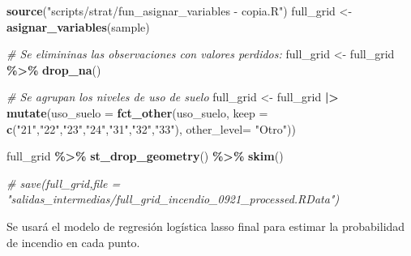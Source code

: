 \documentclass[12pt,a4paper,]{book}
\newenvironment{Shaded}{\begin{snugshade}}{\end{snugshade}}
\newcommand{\AttributeTok}[1]{\textcolor[rgb]{0.13,0.29,0.53}{#1}}
\newcommand{\CommentTok}[1]{\textcolor[rgb]{0.56,0.35,0.01}{\textit{#1}}}
\newcommand{\FunctionTok}[1]{\textcolor[rgb]{0.13,0.29,0.53}{\textbf{#1}}}
\newcommand{\NormalTok}[1]{#1}
\newcommand{\OtherTok}[1]{\textcolor[rgb]{0.56,0.35,0.01}{#1}}
\newcommand{\SpecialCharTok}[1]{\textcolor[rgb]{0.81,0.36,0.00}{\textbf{#1}}}
\newcommand{\StringTok}[1]{\textcolor[rgb]{0.31,0.60,0.02}{#1}}
\numberwithin{dummy}{section}
\theoremstyle{ocrenumbox}
\theoremstyle{blacknumex}
\theoremstyle{blacknumbox}
\theoremstyle{ocrenum}
\theoremstyle{ocrenum}
\begin{document}
\begin{Shaded}
\begin{Highlighting}[]
\FunctionTok{source}\NormalTok{(}\StringTok{"scripts/strat/fun\_asignar\_variables {-} copia.R"}\NormalTok{)}
\NormalTok{full\_grid }\OtherTok{\textless{}{-}} \FunctionTok{asignar\_variables}\NormalTok{(sample)}

\CommentTok{\# Se elimininas las observaciones con valores perdidos:}
\NormalTok{full\_grid }\OtherTok{\textless{}{-}}\NormalTok{ full\_grid }\SpecialCharTok{\%\textgreater{}\%} \FunctionTok{drop\_na}\NormalTok{()}

\CommentTok{\# Se agrupan los niveles de uso de suelo}
\NormalTok{full\_grid }\OtherTok{\textless{}{-}}\NormalTok{ full\_grid }\SpecialCharTok{|\textgreater{}} 
  \FunctionTok{mutate}\NormalTok{(}\AttributeTok{uso\_suelo =} \FunctionTok{fct\_other}\NormalTok{(uso\_suelo,}
                               \AttributeTok{keep =} \FunctionTok{c}\NormalTok{(}\StringTok{"21"}\NormalTok{,}\StringTok{"22"}\NormalTok{,}\StringTok{"23"}\NormalTok{,}\StringTok{"24"}\NormalTok{,}\StringTok{"31"}\NormalTok{,}\StringTok{"32"}\NormalTok{,}\StringTok{"33"}\NormalTok{),}
                               \AttributeTok{other\_level=} \StringTok{"Otro"}\NormalTok{))}

\NormalTok{full\_grid }\SpecialCharTok{\%\textgreater{}\%} \FunctionTok{st\_drop\_geometry}\NormalTok{() }\SpecialCharTok{\%\textgreater{}\%} \FunctionTok{skim}\NormalTok{()}

\CommentTok{\# save(full\_grid,file = "salidas\_intermedias/full\_grid\_incendio\_0921\_processed.RData")}
\end{Highlighting}
\end{Shaded}

Se usará el modelo de regresión logística lasso final para estimar la
probabilidad de incendio en cada punto.
\end{document}
